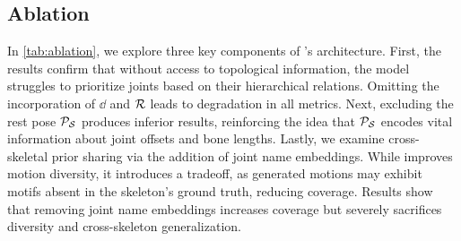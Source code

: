 \subsection{Ablation}


In \cref{tab:ablation}, we explore three key components of \algoname's architecture. 
First, the results confirm that without access to topological information, the model struggles to prioritize joints based on their hierarchical relations. Omitting the incorporation of $\dd$ and $\mathcal{R}$ leads to degradation in all metrics.
Next, excluding the rest pose $\mathcal{P}_{\mathcal{S}}$ produces inferior results, reinforcing the idea that $\mathcal{P}_{\mathcal{S}}$ encodes vital information about joint offsets and bone lengths.
Lastly, we examine cross-skeletal prior sharing via the addition of joint name embeddings. 
While \crossgen improves motion diversity, it introduces a tradeoff, as generated motions may exhibit motifs absent in the skeleton’s ground truth, reducing coverage. Results show that removing joint name embeddings increases coverage but severely sacrifices diversity and cross-skeleton generalization.

\ifarxiv
\else

\fi

